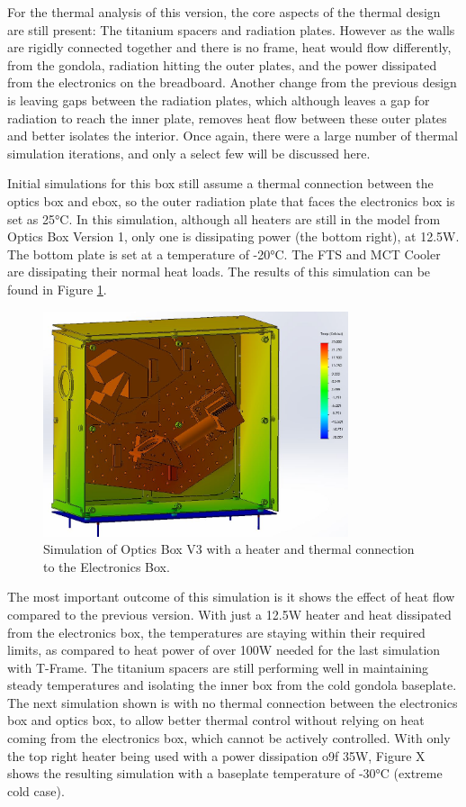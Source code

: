 For the thermal analysis of this version, the core aspects of the thermal design are still present: The titanium spacers and radiation plates. However as the walls are rigidly connected together and there is no frame, heat would flow differently, from the gondola, radiation hitting the outer plates, and the power dissipated from the electronics on the breadboard. Another change from the previous design is leaving gaps between the radiation plates, which although leaves a gap for radiation to reach the  inner plate, removes heat flow between these outer plates and  better isolates the interior. Once again, there were a large number of thermal simulation iterations, and only a select few will be discussed here.

Initial simulations for this box still assume a thermal connection between the optics box and ebox, so the outer radiation plate that faces the electronics box is set as 25°C. In this simulation, although all heaters are still in the model from Optics Box Version 1, only one is dissipating power (the bottom right), at 12.5W. The bottom plate is set at a temperature of -20°C. The FTS and MCT Cooler are dissipating their normal heat loads. The results of this simulation can be found in Figure \ref{fig:OB_V3_TA_1}.

\begin{figure}
    \centering
    \includegraphics[width=0.8\textwidth]{chap3_images/LIFE_V3_images/TA_-20_deg_20_deg_12W_heater.JPG}
    \caption{Simulation of Optics Box V3 with a heater and thermal connection to the Electronics Box.}
    \label{fig:OB_V3_TA_1}
\end{figure}

The most important outcome of this simulation is it shows the effect of heat flow compared to the previous version. With just a 12.5W heater and heat dissipated from the electronics box, the temperatures are staying within their required limits, as compared to heat power of over 100W needed for the last simulation with T-Frame. The titanium spacers are still performing well in maintaining steady temperatures and isolating the inner box from the cold gondola baseplate. The next simulation shown is with no thermal connection between the electronics box and optics box, to allow better thermal control without relying on heat coming from the electronics box, which cannot be actively controlled. With only the top right heater being used with a power dissipation o9f 35W, Figure X shows the resulting simulation with a baseplate temperature of -30°C (extreme cold case).

